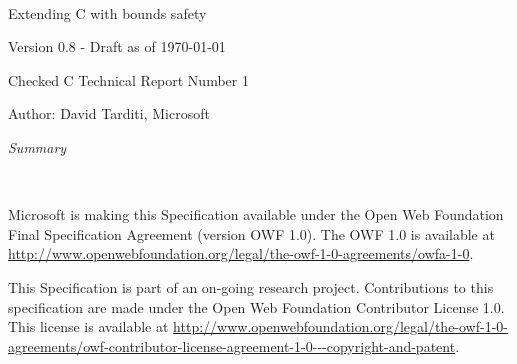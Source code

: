 \documentclass[11pt]{report}
\begin{document}
\begin{titlepage}
{\center
\mbox{ }\\
\vspace{2in}
{\huge Extending C with bounds safety \par}
{Version 0.8 - Draft as of \today \par}
\vspace{0.5in}
{Checked C Technical Report Number 1 \par}
\vspace{0.25in}
{Author: David Tarditi, Microsoft\par} 
\vspace{1in}
{\it Summary \par}

}
\end{titlepage}

\thispagestyle{empty}
\mbox{  }\\
\vspace{1.0in}

Microsoft is making this Specification available under the Open Web
Foundation Final Specification Agreement (version OWF 1.0).  The OWF 1.0
is available at {\color{blue} \url{http://www.openwebfoundation.org/legal/the-owf-1-0-agreements/owfa-1-0}}.

This Specification is part of an on-going research project.
Contributions to this specification
are made under the Open Web Foundation Contributor License 1.0. 
This license is available at {\color{blue} \url{http://www.openwebfoundation.org/legal/the-owf-1-0-agreements/owf-contributor-license-agreement-1-0---copyright-and-patent}}.

\newpage

\setcounter{page}{1}

\tableofcontents

\setcounter{page}{1}














\nocite{Jones2009}
\nocite{Jim2002}



\appendix
% 
% 
\end{document}
